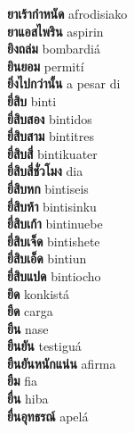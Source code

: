 \textbf{ ยาเร้ากำหนัด  } afrodisiako \\
\textbf{ ยาแอสไพริน  } aspirin \\
\textbf{ ยิงถล่ม  } bombardiá \\
\textbf{ ยินยอม  } permití \\
\textbf{ ยิ่งไปกว่านั้น  } a pesar di \\
\textbf{ ยี่สิบ  } binti \\
\textbf{ ยี่สิบสอง  } bintidos \\
\textbf{ ยี่สิบสาม  } bintitres \\
\textbf{ ยี่สิบสี่  } bintikuater \\
\textbf{ ยี่สิบสี่ชั่วโมง  } dia \\
\textbf{ ยี่สิบหก  } bintiseis \\
\textbf{ ยี่สิบห้า  } bintisinku \\
\textbf{ ยี่สิบเก้า  } bintinuebe \\
\textbf{ ยี่สิบเจ็ด  } bintishete \\
\textbf{ ยี่สิบเอ็ด  } bintiun \\
\textbf{ ยี่สิบแปด  } bintiocho \\
\textbf{ ยึด  } konkistá \\
\textbf{ ยืด  } carga \\
\textbf{ ยืน  } nase \\
\textbf{ ยืนยัน  } testiguá \\
\textbf{ ยืนยันหนักแน่น  } afirma \\
\textbf{ ยืม  } fia \\
\textbf{ ยื่น  } hiba \\
\textbf{ ยื่นอุทธรณ์  } apelá \\
